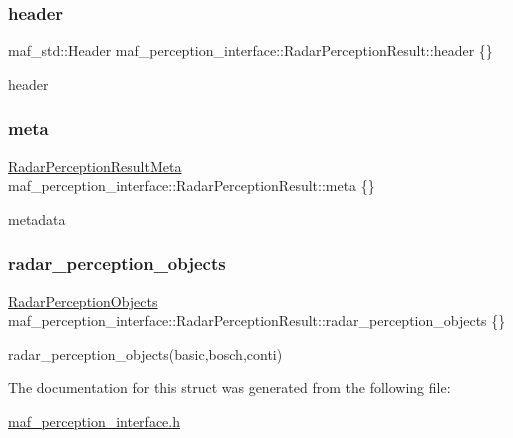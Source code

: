 \subsubsection{\texorpdfstring{header}{header}}
{\footnotesize\ttfamily maf\+\_\+std\+::\+Header maf\+\_\+perception\+\_\+interface\+::\+Radar\+Perception\+Result\+::header \{\}}



header 

\mbox{\label{structmaf__perception__interface_1_1RadarPerceptionResult_a30bfa65b20eb5dced24e2852c4db6a57}} 
\subsubsection{\texorpdfstring{meta}{meta}}
{\footnotesize\ttfamily \hyperlink{structmaf__perception__interface_1_1RadarPerceptionResultMeta}{Radar\+Perception\+Result\+Meta} maf\+\_\+perception\+\_\+interface\+::\+Radar\+Perception\+Result\+::meta \{\}}



metadata 

\mbox{\label{structmaf__perception__interface_1_1RadarPerceptionResult_afd470c855ca0d40c46ef75f341128fd6}} 
\subsubsection{\texorpdfstring{radar\+\_\+perception\+\_\+objects}{radar\_perception\_objects}}
{\footnotesize\ttfamily \hyperlink{structmaf__perception__interface_1_1RadarPerceptionObjects}{Radar\+Perception\+Objects} maf\+\_\+perception\+\_\+interface\+::\+Radar\+Perception\+Result\+::radar\+\_\+perception\+\_\+objects \{\}}



radar\+\_\+perception\+\_\+objects(basic,bosch,conti) 



The documentation for this struct was generated from the following file\+:\begin{DoxyCompactItemize}
\item 
\hyperlink{maf__perception__interface_8h}{maf\+\_\+perception\+\_\+interface.\+h}\end{DoxyCompactItemize}
